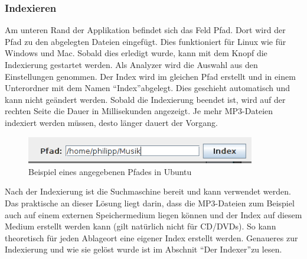 \documentclass[12pt,a4paper,ngerman]{report}
\begin{document}
\subsubsection{Indexieren}
Am unteren Rand der Applikation befindet sich das Feld Pfad. Dort wird der Pfad zu den abgelegten Dateien eingefügt. Dies funktioniert für Linux wie für Windows und Mac. Sobald dies erledigt wurde, kann mit dem Knopf die Indexierung gestartet werden. Als Analyzer wird die Auswahl aus den Einstellungen genommen. Der Index wird im gleichen Pfad erstellt und in einem Unterordner mit dem Namen \textquotedblleft Index\textquotedblright abgelegt. Dies geschieht automatisch und kann nicht geändert werden. Sobald die Indexierung beendet ist, wird auf der rechten Seite die Dauer in Millisekunden angezeigt. Je mehr MP3-Dateien indexiert werden müssen, desto länger dauert der Vorgang.
\begin{figure}[h!]
\centering
\includegraphics[width=10cm]{img/Pfadangabe.png}
\caption{Beispiel eines angegebenen Pfades in Ubuntu\protect\footnotemark}
\end{figure}
Nach der Indexierung ist die Suchmaschine bereit und kann verwendet werden. Das praktische an dieser Lösung liegt darin, dass die MP3-Dateien zum Beispiel auch auf einem externen Speichermedium liegen können und der Index auf diesem Medium erstellt werden kann (gilt natürlich nicht für CD/DVDs). So kann theoretisch für jeden Ablageort eine eigener Index erstellt werden. Genaueres zur Indexierung und wie sie gelöst wurde ist im Abschnit \textquotedblleft Der Indexer\textquotedblright zu lesen.
\end{document}
